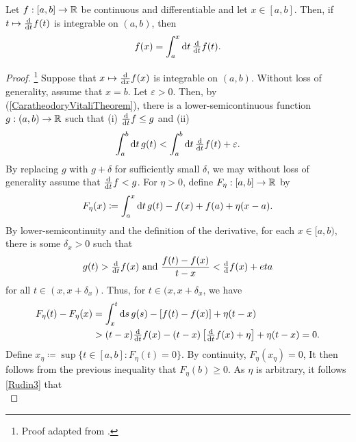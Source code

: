 \begin{thm}\label{FTCI}
Let $f:[a,b]\rightarrow \mathbb{R}$ be continuous and differentiable and let $x\in [a,b]$.  Then, if $t\mapsto \frac{\mathop{}\!\mathrm{d}}{\mathop{}\!\mathrm{d} t}f(t)$ is integrable on $(a,b)$, then
\begin{equation}
f(x)=\int _a^x\mathop{}\!\mathrm{d} t\, \tfrac{\mathop{}\!\mathrm{d}}{\mathop{}\!\mathrm{d} t}f(t).
\end{equation}
\begin{proof}\footnote{Proof adapted from \cite[pg.~149]{BigRudin}.}
Suppose that $x\mapsto \frac{\mathop{}\!\mathrm{d}}{\mathop{}\!\mathrm{d} x}f(x)$ is integrable on $(a,b)$.  Without loss of generality, assume that $x=b$.  Let $\varepsilon >0$.  Then, by  (\cref{CaratheodoryVitaliTheorem}), there is a lower-semicontinuous function $g:(a,b)\rightarrow \mathbb{R}$ such that (i) $\frac{\mathop{}\!\mathrm{d}}{\mathop{}\!\mathrm{d} t}f\leq g$ and (ii)
\begin{equation}
\int _a^b\mathop{}\!\mathrm{d} t\, g(t)<\int _a^b\mathop{}\!\mathrm{d} t\, \tfrac{\mathop{}\!\mathrm{d}}{\mathop{}\!\mathrm{d} t}f(t)+\varepsilon .
\end{equation}
By replacing $g$ with $g+\delta$ for sufficiently small $\delta$, we may without loss of generality assume that $\frac{\mathop{}\!\mathrm{d}}{\mathop{}\!\mathrm{d} t}f<g$.  For $\eta >0$, define $F_\eta :[a,b]\rightarrow \mathbb{R}$ by
\begin{equation}\label{Rudin3}
F_\eta (x)\coloneqq \int _a^x\mathop{}\!\mathrm{d} t\, g(t)-f(x)+f(a)+\eta (x-a).
\end{equation}
By lower-semicontinuity and the definition of the derivative, for each $x\in [a,b)$, there is some $\delta _x>0$ such that
\begin{equation}
g(t)>\tfrac{\mathop{}\!\mathrm{d}}{\mathop{}\!\mathrm{d} t}f(x)\text{ and }\frac{f(t)-f(x)}{t-x}<\tfrac{\mathop{}\!\mathrm{d}}{\mathop{}\!\mathrm{d} }f(x)+eta
\end{equation}
for all $t\in (x,x+\delta _x)$.  Thus, for $t\in (x,x+\delta _x$, we have
\begin{equation}\begin{split}
F_\eta (t)-F_\eta (x) & =\int _x^t\mathop{}\!\mathrm{d} s\, g(s)-[f(t)-f(x)]+\eta (t-x) \\
& >(t-x)\tfrac{\mathop{}\!\mathrm{d}}{\mathop{}\!\mathrm{d} t}f(x)-(t-x)\left[ \tfrac{\mathop{}\!\mathrm{d}}{\mathop{}\!\mathrm{d} t}f(x)+\eta \right] +\eta (t-x)=0.
\end{split}
\end{equation}
Define $x_\eta \coloneqq \sup \{ t\in [a,b]:F_\eta (t)=0\}$.  By continuity, $F_\eta (x_\eta )=0$,   It then follows from the previous inequality that $F_\eta (b)\geq 0$.  As $\eta$ is arbitrary, it follows \eqref{Rudin3} that
\begin{equation}

\end{equation}
\end{proof}
\end{thm}
